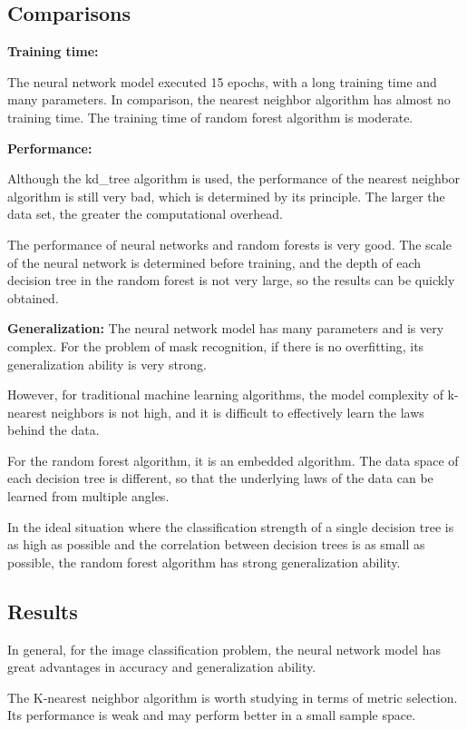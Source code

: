 \documentclass{article}
\begin{document}
  \subsection{Comparisons}
  \textbf{Training time:}

  The neural network model executed 15 epochs, with a long training time and many parameters. In comparison, the nearest neighbor algorithm has almost no training time. The training time of random forest algorithm is moderate.

  \textbf{Performance:}

  Although the kd\_tree algorithm is used, the performance of the nearest neighbor algorithm is still very bad, which is determined by its principle. The larger the data set, the greater the computational overhead.

  The performance of neural networks and random forests is very good. The scale of the neural network is determined before training, and the depth of each decision tree in the random forest is not very large, so the results can be quickly obtained.

  \textbf{Generalization:}
  The neural network model has many parameters and is very complex. For the problem of mask recognition, if there is no overfitting, its generalization ability is very strong.

  However, for traditional machine learning algorithms, the model complexity of k-nearest neighbors is not high, and it is difficult to effectively learn the laws behind the data.

  For the random forest algorithm, it is an embedded algorithm. The data space of each decision tree is different, so that the underlying laws of the data can be learned from multiple angles.
  
  In the ideal situation where the classification strength of a single decision tree is as high as possible and the correlation between decision trees is as small as possible, the random forest algorithm has strong generalization ability.
  \subsection{Results}
  In general, for the image classification problem, the neural network model has great advantages in accuracy and generalization ability.

  The K-nearest neighbor algorithm is worth studying in terms of metric selection. Its performance is weak and may perform better in a small sample space.
\end{document}

